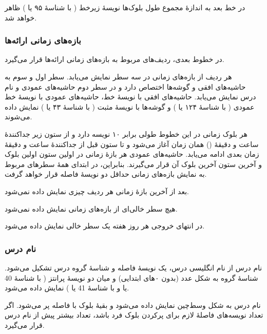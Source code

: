 \documentclass{utap}
\begin{document}
    در خط بعد به اندازهٔ مجموع طول بلوک‌ها نویسهٔ زیرخط (\lr{\texttt{\_}} با شناسهٔ  ۹۵ یا ) ظاهر خواهد شد.

    \subsubsection{بازه‌های زمانی ارائه‌ها}

    در خطوط بعدی، ردیف‌های مربوط به بازه‌های زمانی ارائه‌ها قرار می‌گیرد.
    
    هر ردیف از بازه‌های زمانی در سه سطر نمایش می‌یابد. سطر اول و سوم به حاشیه‌های افقی و گوشه‌ها اختصاص دارد و در سطر دوم حاشیه‌های عمودی و نام درس نمایش می‌یابد. حاشیه‌های افقی با نویسهٔ خط، حاشیه‌های عمودی با نویسهٔ خط عمودی (\lr{\texttt{|}} با شناسهٔ  ۱۲۴ یا ) و گوشه‌ها با نویسهٔ مثبت (\lr{\texttt{+}} با شناسهٔ  ۴۳ یا ) نمایش داده می‌شوند.
    
    هر بلوک زمانی در این خطوط طولی برابر ۱۰ نویسه دارد و از ستون زیر جداکنندهٔ ساعت و دقیقهٔ (\lr{\texttt{:}}) همان زمان آغاز می‌شود و تا ستون قبل از جداکنندهٔ ساعت و دقیقهٔ زمان بعدی ادامه می‌یابد. حاشیه‌های عمودی هر بازهٔ زمانی در اولین ستون اولین بلوک و آخرین ستون آخرین بلوک آن قرار می‌گیرند. بنابراین، در ابتدای همهٔ سطرهای مربوط به نمایش بازه‌های زمانی حداقل دو نویسهٔ فاصله قرار خواهد گرفت.

    بعد از آخرین بازهٔ زمانی هر ردیف چیزی نمایش داده نمی‌شود.

    هیچ سطر خالی‌ای از بازه‌های زمانی نمایش داده نمی‌شود.

    در انتهای خروجی هر روز هفته یک سطر خالی نمایش داده می‌شود.

    \subsubsection{نام درس}
    
    نام درس از نام انگلیسی درس، یک نویسهٔ فاصله و شناسهٔ گروه درس تشکیل می‌شود. شناسهٔ گروه به شکل عدد (بدون ۰‌های ابتدایی) و میان دو نویسهٔ پرانتز (\lr{\texttt{(}} با شناسهٔ  40 یا  و \lr{\texttt{)}} با شناسهٔ  41 یا ) نمایش داده می‌شود.
    
    نام درس به شکل وسط‌چین نمایش داده می‌شود و بقیهٔ بلوک با فاصله پر می‌شود. اگر تعداد نویسه‌های فاصلهٔ لازم برای پرکردن بلوک فرد باشد، تعداد بیشتر پیش از نام درس قرار می‌گیرد.

    ~
\end{document}
